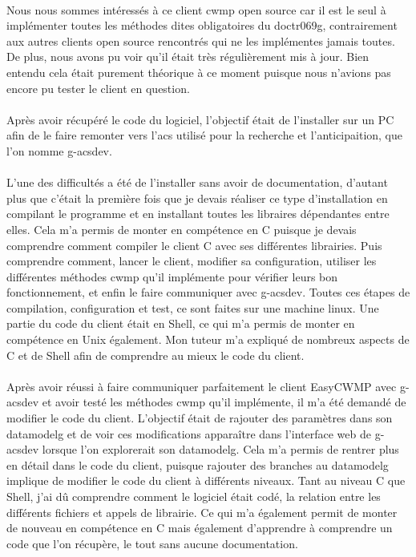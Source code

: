 \documentclass[12pt,a4paper]{report}
\begin{document}
\paragraph*{}Nous nous sommes intéressés à ce client \gls{cwmp} open source car il est le seul à implémenter toutes les méthodes dites obligatoires du \gls{doctr069g}, contrairement aux autres clients open source rencontrés qui ne les implémentes jamais toutes. De plus, nous avons pu voir qu’il était très régulièrement mis à jour. Bien entendu cela était purement théorique à ce moment puisque nous n'avions pas encore pu tester le client en question.
\paragraph*{}Après avoir récupéré le code du logiciel, l’objectif était de l’installer sur un PC afin de le faire remonter vers l'\gls{acs} utilisé pour la recherche et l'anticipaition, que l'on nomme g-acsdev. 
\paragraph*{}L’une des difficultés a été de l’installer sans avoir de documentation, d’autant plus que c’était la première fois que je devais réaliser ce type d’installation en compilant le programme et en installant toutes les libraires dépendantes entre elles. Cela m’a permis de monter en compétence en C puisque je devais comprendre comment compiler le client C avec ses différentes librairies. Puis comprendre comment, lancer le client, modifier sa configuration, utiliser les différentes méthodes \gls{cwmp} qu’il implémente pour vérifier leurs bon fonctionnement, et enfin le faire communiquer avec g-acsdev. Toutes ces étapes de compilation, configuration et test, ce sont faites sur une machine linux. Une partie du code du client était en Shell, ce qui m’a permis de monter en compétence en Unix également. Mon tuteur m’a expliqué de nombreux aspects de C et de Shell afin de comprendre au mieux le code du client.
\paragraph*{}Après avoir réussi à faire communiquer parfaitement le client EasyCWMP avec g-acsdev et avoir testé les méthodes \gls{cwmp} qu’il implémente, il m’a été demandé de modifier le code du client. L’objectif était de rajouter des paramètres dans son \gls{datamodelg} et de voir ces modifications apparaître dans l’interface web de g-acsdev lorsque l'on explorerait son \gls{datamodelg}. Cela m’a permis de rentrer plus en détail dans le code du client, puisque rajouter des branches au \gls{datamodelg} implique de modifier le code du client à différents niveaux. Tant au niveau C que Shell, j’ai dû comprendre comment le logiciel était codé, la relation entre les différents fichiers et appels de librairie. Ce qui m’a également permit de monter de nouveau en compétence en C mais également d’apprendre à comprendre un code que l’on récupère, le tout sans aucune documentation.
\end{document}
